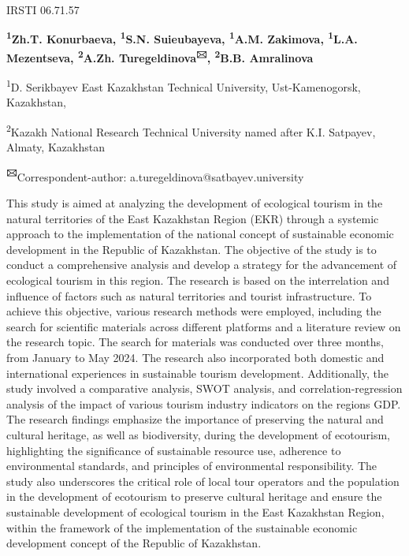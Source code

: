 \newpage
IRSTI 06.71.57


\begin{center}
{\bfseries \textsuperscript{1}Zh.T. Konurbaeva, \textsuperscript{1}S.N.
Suieubayeva, \textsuperscript{1}A.M. Zakimova, \textsuperscript{1}L.A.
Mezentseva, \textsuperscript{2}A.Zh. Turegeldinova\textsuperscript{🖂},
\textsuperscript{2}B.B. Amralinova}

\textsuperscript{1}D. Serikbayev East Kazakhstan Technical University,
Ust-Kamenogorsk, Kazakhstan,

\textsuperscript{2}Kazakh National Research Technical University named
after K.I. Satpayev, Almaty, Kazakhstan
\end{center}

{\bfseries \textsuperscript{🖂}}Correspondent-author:
a.turegeldinova@satbayev.university

This study is aimed at analyzing the development of ecological tourism
in the natural territories of the East Kazakhstan Region (EKR) through a
systemic approach to the implementation of the national concept of
sustainable economic development in the Republic of Kazakhstan. The
objective of the study is to conduct a comprehensive analysis and
develop a strategy for the advancement of ecological tourism in this
region. The research is based on the interrelation and influence of
factors such as natural territories and tourist infrastructure. To
achieve this objective, various research methods were employed,
including the search for scientific materials across different platforms
and a literature review on the research topic. The search for materials
was conducted over three months, from January to May 2024. The research
also incorporated both domestic and international experiences in
sustainable tourism development. Additionally, the study involved a
comparative analysis, SWOT analysis, and correlation-regression analysis
of the impact of various tourism industry indicators on the
region\textquotesingle s GDP. The research findings emphasize the
importance of preserving the natural and cultural heritage, as well as
biodiversity, during the development of ecotourism, highlighting the
significance of sustainable resource use, adherence to environmental
standards, and principles of environmental responsibility. The study
also underscores the critical role of local tour operators and the
population in the development of ecotourism to preserve cultural
heritage and ensure the sustainable development of ecological tourism in
the East Kazakhstan Region, within the framework of the implementation
of the sustainable economic development concept of the Republic of
Kazakhstan.

